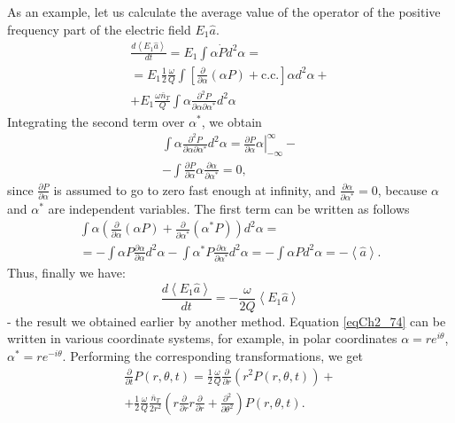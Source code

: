 As an example, let us calculate the average value of the operator of the positive
frequency part of the electric field $E_1\hat{a}$.   
\begin{eqnarray}
\frac{d \left<E_1\hat{a}\right>}{d t} = 
E_1\int \alpha \dot{P}d^2 \alpha =
\nonumber \\
=E_1 \frac{1}{2}\frac{\omega}{Q}
\int \left[
\frac{\partial}{\partial \alpha}\left(\alpha P\right) + \mbox{c.c.}
\right]\alpha d^2 \alpha +
\nonumber \\
+E_1\frac{\omega \bar{n}_T}{Q}\int \alpha
\frac{\partial^2 P}{\partial \alpha \partial \alpha^{*}}
d^2 \alpha
\label{eqCh2_75}
\end{eqnarray}
Integrating the second term over $\alpha^{*}$, we obtain
\begin{eqnarray}
\int\alpha\frac{\partial^2 P}{\partial \alpha \partial \alpha^{*}}
d^2 \alpha = 
\left.\frac{\partial P}{\partial
  \alpha}\alpha\right|_{-\infty}^{\infty} - 
\nonumber \\
- \int \frac{\partial P}{\partial \alpha} \alpha
\frac{\partial \alpha}{\partial \alpha^{*}} = 0,
\nonumber
\end{eqnarray}
since $\frac{\partial P}{\partial \alpha}$ is assumed to go to zero fast enough at infinity, and 
$\frac{\partial \alpha}{\partial \alpha^{*}} = 0$, because 
$\alpha$ and $\alpha^{*}$ are independent variables.
The first term can be written as follows
\begin{eqnarray}
\int \alpha \left(
\frac{\partial}{\partial \alpha}\left(\alpha P\right) + 
\frac{\partial}{\partial \alpha^{*}}\left(\alpha^{*} P\right)
\right) d^2 \alpha = 
\nonumber \\
= - \int \alpha P \frac{\partial \alpha}{\partial \alpha} d^2 \alpha -
\int \alpha^{*} P \frac{\partial \alpha}{\partial \alpha^{*}} d^2 \alpha  
= - \int \alpha P  d^2 \alpha
= - \left<\hat{a}\right>.
\nonumber
\end{eqnarray}
Thus, finally we have: 
\begin{equation}
\frac{d \left<E_1\hat{a}\right>}{d t} = 
-\frac{\omega}{2 Q}\left<E_1\hat{a}\right>
\label{eqCh2_76}
\end{equation}
- the result we obtained earlier by another method. Equation
\eqref{eqCh2_74} can be written in various coordinate systems,
for example, in polar coordinates $\alpha = r e^{i \theta}$, $\alpha^{*} = r e^{- i
  \theta}$. Performing the corresponding transformations, we get 
\begin{eqnarray}
\frac{\partial}{\partial t}P\left(r, \theta, t\right) = 
\frac{1}{2}\frac{\omega}{Q}
\frac{\partial}{\partial r}
\left(r^2 P\left(r, \theta, t\right)\right) +
\nonumber \\
+ \frac{1}{2}\frac{\omega}{Q}
\frac{\bar{n}_T}{2 r^2}
\left(
r \frac{\partial}{\partial r} r \frac{\partial}{\partial r} +
\frac{\partial^2}{\partial \theta^2}
\right)
P\left(r, \theta, t\right).
\label{eqCh2_77}
\end{eqnarray}
